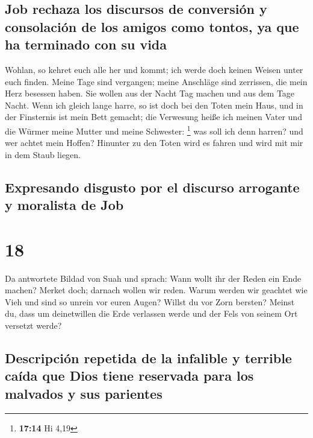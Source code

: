 \hypertarget{job-rechaza-los-discursos-de-conversiuxf3n-y-consolaciuxf3n-de-los-amigos-como-tontos-ya-que-ha-terminado-con-su-vida}{%
\subsection{Job rechaza los discursos de conversión y consolación de los
amigos como tontos, ya que ha terminado con su
vida}\label{job-rechaza-los-discursos-de-conversiuxf3n-y-consolaciuxf3n-de-los-amigos-como-tontos-ya-que-ha-terminado-con-su-vida}}

 Wohlan, so kehret euch alle her und kommt; ich werde
doch keinen Weisen unter euch finden.  Meine Tage sind
vergangen; meine Anschläge sind zerrissen, die mein Herz besessen haben.
 Sie wollen aus der Nacht Tag machen und aus dem Tage
Nacht.  Wenn ich gleich lange harre, so ist doch bei den
Toten mein Haus, und in der Finsternis ist mein Bett gemacht;
 die Verwesung heiße ich meinen Vater und die Würmer
meine Mutter und meine Schwester: \footnote{\textbf{17:14} Hi 4,19}
 was soll ich denn harren? und wer achtet mein Hoffen?
 Hinunter zu den Toten wird es fahren und wird mit mir in
dem Staub liegen.

\hypertarget{expresando-disgusto-por-el-discurso-arrogante-y-moralista-de-job}{%
\subsection{Expresando disgusto por el discurso arrogante y moralista de
Job}\label{expresando-disgusto-por-el-discurso-arrogante-y-moralista-de-job}}

\hypertarget{section-17}{%
\section{18}\label{section-17}}

 Da antwortete Bildad von Suah und sprach: 
Wann wollt ihr der Reden ein Ende machen? Merket doch; darnach wollen
wir reden.  Warum werden wir geachtet wie Vieh und sind so
unrein vor euren Augen?  Willst du vor Zorn bersten?
Meinst du, dass um deinetwillen die Erde verlassen werde und der Fels
von seinem Ort versetzt werde?

\hypertarget{descripciuxf3n-repetida-de-la-infalible-y-terrible-cauxedda-que-dios-tiene-reservada-para-los-malvados-y-sus-parientes}{%
\subsection{Descripción repetida de la infalible y terrible caída que
Dios tiene reservada para los malvados y sus
parientes}\label{descripciuxf3n-repetida-de-la-infalible-y-terrible-cauxedda-que-dios-tiene-reservada-para-los-malvados-y-sus-parientes}}


